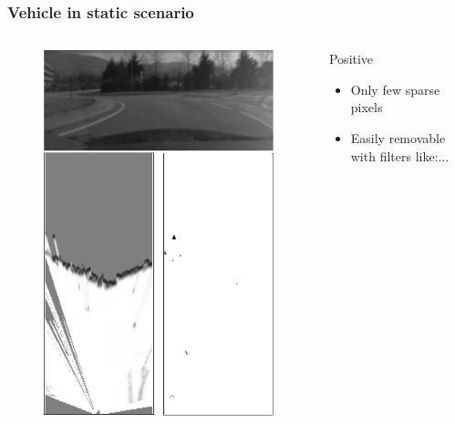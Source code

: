 \documentclass{beamer}
\begin{document}
	\begin{frame}
		\frametitle{Vehicle in static scenario}
		
		\begin{columns}[t]
			\begin{column}[t]{5cm}
				\begin{figure}[h]
				\center
				\includegraphics[scale=0.55]{../img/fig:result:scenestatic}
				\end{figure}
			\end{column}
			\begin{column}[t]{5cm}
				\begin{exampleblock}{Positive}
				\begin{itemize}
				\item Only few sparse pixels
				\item Easily removable with filters like:...
				\end{itemize}
				\end{exampleblock}		
			\end{column}
		\end{columns}
	\end{frame}			
\end{document}
